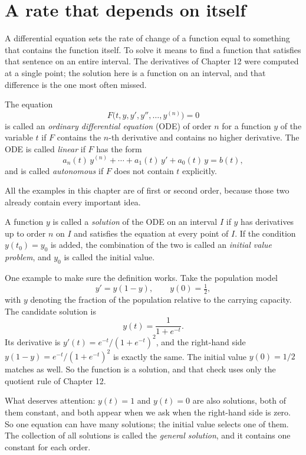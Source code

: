 \section{A rate that depends on itself}

A differential equation sets the rate of change of a function equal to something that
contains the function itself. To solve it means to find a function that satisfies that
sentence on an entire interval. The derivatives of Chapter 12 were computed at a single
point; the solution here is a function on an interval, and that difference is the one most
often missed.

\begin{definisi}
The equation
\[
F\bigl(t,y,y',y'',\dots,y^{(n)}\bigr)=0
\]
is called an \emph{ordinary differential equation} (ODE) of order $n$ for a function $y$ of
the variable $t$ if $F$ contains the $n$-th derivative and contains no higher derivative.
The ODE is called \emph{linear} if $F$ has the form
\[
a_{n}(t)\,y^{(n)}+\cdots+a_{1}(t)\,y'+a_{0}(t)\,y=b(t),
\]
and is called \emph{autonomous} if $F$ does not contain $t$ explicitly.
\end{definisi}

 All the examples in
this chapter are of first or second order, because those two already contain every important
idea.

\begin{definisi}
A function $y$ is called a \emph{solution} of the ODE on an interval $I$ if $y$ has
derivatives up to order $n$ on $I$ and satisfies the equation at every point of $I$. If the
condition $y(t_{0})=y_{0}$ is added, the combination of the two is called an \emph{initial
value problem}, and $y_{0}$ is called the initial value.
\end{definisi}

One example to make sure the definition works. Take the population model
\[
y'=y(1-y),\qquad y(0)=\tfrac12 ,
\]
with $y$ denoting the fraction of the population relative to the carrying capacity. The
candidate solution is
\[
y(t)=\frac{1}{1+e^{-t}} .
\]
Its derivative is $y'(t)=e^{-t}/(1+e^{-t})^{2}$, and the right-hand side
$y(1-y)=e^{-t}/(1+e^{-t})^{2}$ is exactly the same. The initial value $y(0)=1/2$ matches as
well. So the function is a solution, and that check uses only the quotient rule of
Chapter 12.

What deserves attention: $y(t)=1$ and $y(t)=0$ are also solutions, both of them constant,
and both appear when we ask when the right-hand side is zero. So one equation can have many
solutions; the initial value selects one of them. The collection of all solutions is called
the \emph{general solution}, and it contains one constant for each order.

